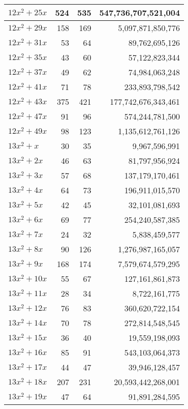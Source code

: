 \documentclass[a4paper]{amsproc}
\theoremstyle{plain}
\begin{document}
\begin{longtable}{ | l | r | r | r | }
$12x^2 + 25x$ & 524 & 535 & 547{,}736{,}707{,}521{,}004 \\ \hline
$12x^2 + 29x$ & 158 & 169 & 5{,}097{,}871{,}850{,}776 \\ \hline
$12x^2 + 31x$ & 53 & 64 & 89{,}762{,}695{,}126 \\ \hline
$12x^2 + 35x$ & 43 & 60 & 57{,}122{,}823{,}344 \\ \hline
$12x^2 + 37x$ & 49 & 62 & 74{,}984{,}063{,}248 \\ \hline
$12x^2 + 41x$ & 71 & 78 & 233{,}893{,}798{,}542 \\ \hline
$12x^2 + 43x$ & 375 & 421 & 177{,}742{,}676{,}343{,}461 \\ \hline
$12x^2 + 47x$ & 91 & 96 & 574{,}244{,}781{,}500 \\ \hline
$12x^2 + 49x$ & 98 & 123 & 1{,}135{,}612{,}761{,}126 \\ \hline
$13x^2 + x$ & 30 & 35 & 9{,}967{,}596{,}991 \\ \hline
$13x^2 + 2x$ & 46 & 63 & 81{,}797{,}956{,}924 \\ \hline
$13x^2 + 3x$ & 57 & 68 & 137{,}179{,}170{,}461 \\ \hline
$13x^2 + 4x$ & 64 & 73 & 196{,}911{,}015{,}570 \\ \hline
$13x^2 + 5x$ & 42 & 45 & 32{,}101{,}081{,}693 \\ \hline
$13x^2 + 6x$ & 69 & 77 & 254{,}240{,}587{,}385 \\ \hline
$13x^2 + 7x$ & 24 & 32 & 5{,}838{,}459{,}577 \\ \hline
$13x^2 + 8x$ & 90 & 126 & 1{,}276{,}987{,}165{,}057 \\ \hline
$13x^2 + 9x$ & 168 & 174 & 7{,}579{,}674{,}579{,}295 \\ \hline
$13x^2 + 10x$ & 55 & 67 & 127{,}161{,}861{,}873 \\ \hline
$13x^2 + 11x$ & 28 & 34 & 8{,}722{,}161{,}775 \\ \hline
$13x^2 + 12x$ & 76 & 83 & 360{,}620{,}722{,}154 \\ \hline
$13x^2 + 14x$ & 70 & 78 & 272{,}814{,}548{,}545 \\ \hline
$13x^2 + 15x$ & 36 & 40 & 19{,}559{,}198{,}093 \\ \hline
$13x^2 + 16x$ & 85 & 91 & 543{,}103{,}064{,}373 \\ \hline
$13x^2 + 17x$ & 44 & 47 & 39{,}946{,}128{,}457 \\ \hline
$13x^2 + 18x$ & 207 & 231 & 20{,}593{,}442{,}268{,}001 \\ \hline
$13x^2 + 19x$ & 47 & 64 & 91{,}891{,}284{,}595 \\ \hline

\end{longtable}
\end{document}
